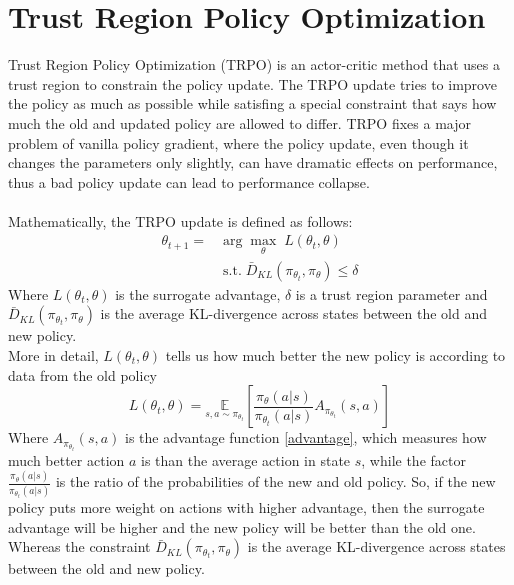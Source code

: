 \section{Trust Region Policy Optimization}
Trust Region Policy Optimization (TRPO) \cite{schulman2015trust} is an actor-critic method that uses a trust region to constrain the policy update. The TRPO update tries to improve the policy as much as possible while satisfing a special constraint that says how much the old and updated policy are allowed to differ. TRPO fixes a major problem of vanilla policy gradient, where the policy update, even though it changes the parameters only slightly, can have dramatic effects on performance, thus a bad policy update can lead to performance collapse.\\\\
Mathematically, the TRPO update is defined as follows:
\begin{equation}
    \begin{split}
        \theta_{t+1} = & \arg\max_{\theta} \; L(\theta_t, \theta)\\
        & \; \text{s.t.} \; \bar D_{KL}(\pi_{\theta_t}, \pi_{\theta}) \leq \delta        
    \end{split}
    \label{eq:trpo-update}
\end{equation}
Where $L(\theta_t, \theta)$ is the surrogate advantage, $\delta$ is a trust region parameter and $\bar D_{KL}(\pi_{\theta_t}, \pi_{\theta})$ is the average KL-divergence across states between the old and new policy.\\
More in detail, $L(\theta_t, \theta)$ tells us how much better the new policy is according to data from the old policy
\begin{equation}
    L(\theta_t, \theta) = \underset{s, a \sim \pi_{\theta_t}}{\mathbb{E}} \left[ \frac{\pi_{\theta}(a|s)}{\pi_{\theta_t}(a|s)} A_{\pi_{\theta_t}}(s, a) \right]
    \label{eq:surrogate-advantage}
\end{equation}
Where $A_{\pi_{\theta_t}}(s, a)$ is the advantage function \eqref{advantage}, which measures how much better action $a$ is than the average action in state $s$, while the factor $\frac{\pi_{\theta}(a|s)}{\pi_{\theta_t}(a|s)}$ is the ratio of the probabilities of the new and old policy. So, if the new policy puts more weight on actions with higher advantage, then the surrogate advantage will be higher and the new policy will be better than the old one.\\
Whereas the constraint $\bar D_{KL}(\pi_{\theta_t}, \pi_{\theta})$ is the average KL-divergence across states between the old and new policy.
